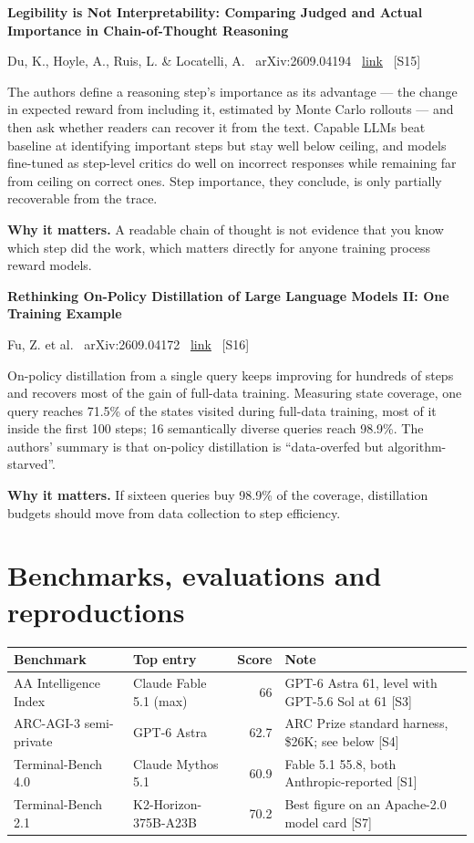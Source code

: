 \documentclass[11pt,a4paper]{article}
\newcommand{\entry}[4]{%
  \par\vspace{0.7em}%
  {\sffamily\bfseries\color{brandink}#1}\par
  {\footnotesize\color{brandgrey}#2 \textbullet\ \href{#3}{link} \textbullet\ \srcref{#4}}\par
  \vspace{0.15em}}
\newcommand{\why}[1]{\par{\small\textbf{Why it matters.} #1}\par}
\newcommand{\srcref}[1]{\textcolor{brandaccent}{[S#1]}}
\begin{document}
\entry{Legibility is Not Interpretability: Comparing Judged and Actual Importance in Chain-of-Thought Reasoning}{Du, K., Hoyle, A., Ruis, L. \& Locatelli, A. \textbullet\ arXiv:2609.04194}{https://arxiv.org/abs/2609.04194}{15}
The authors define a reasoning step's importance as its advantage --- the change in
expected reward from including it, estimated by Monte Carlo rollouts --- and then ask
whether readers can recover it from the text. Capable LLMs beat baseline at identifying
important steps but stay well below ceiling, and models fine-tuned as step-level critics
do well on incorrect responses while remaining far from ceiling on correct ones. Step
importance, they conclude, is only partially recoverable from the trace.
\why{A readable chain of thought is not evidence that you know which step did the work,
which matters directly for anyone training process reward models.}

\entry{Rethinking On-Policy Distillation of Large Language Models II: One Training Example}{Fu, Z. et al. \textbullet\ arXiv:2609.04172}{https://arxiv.org/abs/2609.04172}{16}
On-policy distillation from a single query keeps improving for hundreds of steps and
recovers most of the gain of full-data training. Measuring state coverage, one query
reaches 71.5\% of the states visited during full-data training, most of it inside the
first 100 steps; 16 semantically diverse queries reach 98.9\%. The authors' summary is that
on-policy distillation is ``data-overfed but algorithm-starved''.
\why{If sixteen queries buy 98.9\% of the coverage, distillation budgets should move from
data collection to step efficiency.}

\section{Benchmarks, evaluations and reproductions}

\begin{tabularx}{\textwidth}{@{}l l r X@{}}
\toprule
\textbf{Benchmark} & \textbf{Top entry} & \textbf{Score} & \textbf{Note} \\
\midrule
AA Intelligence Index & Claude Fable 5.1 (max) & 66 & GPT-6 Astra 61, level with GPT-5.6 Sol at 61 \srcref{3} \\
ARC-AGI-3 semi-private & GPT-6 Astra & 62.7 & ARC Prize standard harness, \$26K; see below \srcref{4} \\
Terminal-Bench 4.0 & Claude Mythos 5.1 & 60.9 & Fable 5.1 55.8, both Anthropic-reported \srcref{1} \\
Terminal-Bench 2.1 & K2-Horizon-375B-A23B & 70.2 & Best figure on an Apache-2.0 model card \srcref{7} \\
\bottomrule
\end{tabularx}
\vspace{0.4em}
\end{document}
